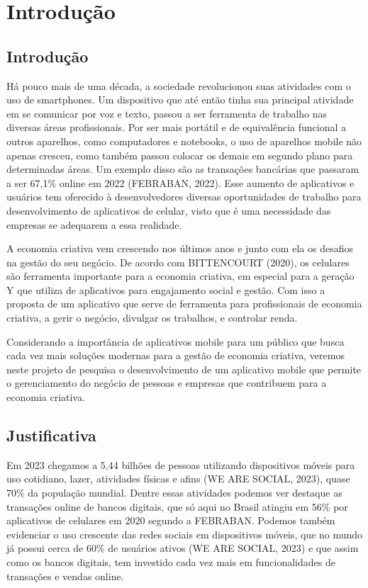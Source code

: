 \chapter{Introdução}\label{ch:introducao}
\section{Introdução}

Há pouco mais de uma década, a sociedade revolucionou suas atividades com o uso de smartphones.
Um dispositivo que até então tinha sua principal atividade em se comunicar por voz e texto, passou a ser ferramenta de trabalho nas diversas áreas profissionais.
Por ser mais portátil e de equivalência funcional a outros aparelhos, como computadores e notebooks, o uso de aparelhos mobile não apenas cresceu, como também passou colocar os demais em segundo plano para determinadas áreas.
Um exemplo disso são as transações bancárias que passaram a ser 67,1\% online em 2022\cite{bebraban2022} (FEBRABAN, 2022).
Esse aumento de aplicativos e usuários tem oferecido à desenvolvedores diversas oportunidades de trabalho para desenvolvimento de aplicativos de celular, visto que é uma necessidade das empresas se adequarem a essa realidade.

A economia criativa vem crescendo nos últimos anos e junto com ela os desafios na gestão do seu negócio.
De acordo com  BITTENCOURT (2020), os celulares são ferramenta importante para a economia criativa, em especial para a geração Y que utiliza de aplicativos para engajamento social e gestão.
Com isso a proposta de um aplicativo que serve de ferramenta para profissionais de economia criativa, a gerir o negócio, divulgar os trabalhos, e controlar renda.

Considerando a importância de aplicativos mobile para um público que busca cada vez mais soluções modernas para a gestão de economia criativa, veremos neste projeto de pesquisa o desenvolvimento de um aplicativo mobile que permite o gerenciamento do negócio de pessoas e empresas que contribuem para a economia criativa.

\section{Justificativa}\label{sec:justificativa}

Em 2023 chegamos a 5,44 bilhões de pessoas utilizando dispositivos móveis para uso cotidiano, lazer, atividades físicas e afins (WE ARE SOCIAL, 2023), quase 70\% da população mundial.
Dentre essas atividades podemos ver destaque as transações online de bancos digitais, que só aqui no Brasil atingiu em 56\% por aplicativos de celulares em 2020 segundo a FEBRABAN. Podemos também evidenciar o uso crescente das redes sociais em dispositivos móveis, que no mundo já possui cerca de 60\% de usuários ativos (WE ARE SOCIAL, 2023) e que assim como os bancos digitais, tem investido cada vez mais em funcionalidades de transações e vendas online.

